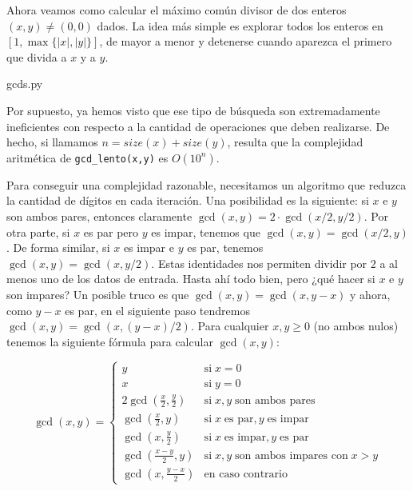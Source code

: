 \documentclass[a4paper, 11pt]{article}
\theoremstyle{plain}
\theoremstyle{definition}
\begin{document}
\bigskip

Ahora veamos como calcular el máximo común divisor de dos enteros $(x,y)\neq
(0,0)$ dados. La idea más simple es explorar todos los enteros en
$[1,\max\{|x|,|y|\}]$, de mayor a menor y detenerse cuando aparezca el primero
que divida a $x$ y a $y$.

\bigskip


{gcds.py}

\bigskip

Por supuesto, ya hemos visto que ese tipo de búsqueda son extremadamente
ineficientes con respecto a la cantidad de operaciones que deben realizarse.
De hecho, si llamamos $n=size(x)+size(y)$, resulta que la complejidad 
aritmética de \texttt{gcd\_lento(x,y)} es $O(10^n)$.

\bigskip

Para conseguir una complejidad razonable, necesitamos un algoritmo
que reduzca la cantidad de dígitos en cada iteración. Una posibilidad
es la siguiente: si $x$ e $y$ son ambos pares, entonces claramente
$\gcd(x,y)=2\cdot\gcd(x/2,y/2)$. Por otra parte, si $x$ es par pero $y$ es
impar, tenemos que $\gcd(x,y)=\gcd(x/2,y)$. De forma similar, si $x$
es impar e $y$ es par, tenemos $\gcd(x,y)=\gcd(x,y/2)$. Estas identidades
nos permiten dividir por $2$ a al menos uno de los datos de entrada.
Hasta ahí todo bien, pero ¿qué hacer si $x$ e $y$ son impares?
Un posible truco es que $\gcd(x,y)=\gcd(x,y-x)$ y ahora, como $y-x$ es
par, en el siguiente paso tendremos $\gcd(x,y)=\gcd(x,(y-x)/2)$. Para
cualquier $x,y\geq 0$ (no ambos nulos) tenemos la siguiente fórmula
para calcular $\gcd(x,y)$:

\[
   \gcd(x,y)=\left\{\begin{array}{ll}
      y                          & \text{si}\;x=0\\
      x                          & \text{si}\;y=0\\
      2\gcd(\frac{x}2,\frac{y}2) & \text{si}\;x,y\;\text{son ambos pares} \\
      \gcd(\frac{x}2,y)          & \text{si}\;x\;\text{es par}, y\;\text{es impar} \\
      \gcd(x,\frac{y}2)          & \text{si}\;x\;\text{es impar}, y\;\text{es par} \\
      \gcd(\frac{x-y}2,y)        & \text{si}\;x,y\;\text{son ambos impares con}\;x>y\\
      \gcd(x,\frac{y-x}2)        & \text{en caso contrario}
   \end{array}\right.
\]
\end{document}
